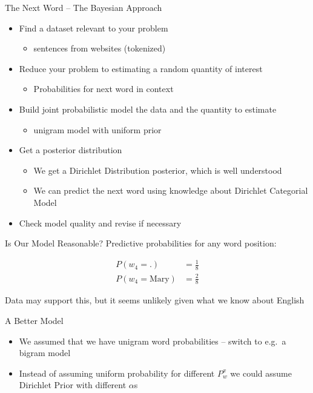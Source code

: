 \documentclass[11pt]{beamer}
\begin{document}
	\begin{frame}{The Next Word -- The Bayesian Approach}
		\centering
		\begin{itemize}
			\item Find a dataset relevant to your problem
			\begin{itemize}
				\item sentences from websites (tokenized) \checkmark
			\end{itemize}
			\item Reduce your problem to estimating a random quantity of interest
			\begin{itemize}
				\item Probabilities for next word in context \checkmark 
			\end{itemize}
			\item Build joint probabilistic model the data and the quantity to estimate
			\begin{itemize}
				\item unigram model with uniform prior \checkmark
			\end{itemize}
			\item<2-> Get a posterior distribution
			\begin{itemize}
				\item<2-> We get a Dirichlet Distribution posterior, which is well understood \checkmark
				\item<2-> We can predict the next word using knowledge about Dirichlet Categorial Model \checkmark
			\end{itemize}
			\item<3-> Check model quality and revise if necessary
		\end{itemize}
	\end{frame}
	
	\begin{frame}{Is Our Model Reasonable?}
		Predictive probabilities for any word position:
		
		\begin{align}
			P(w_4 = \text{.}) & = \frac{1}{8} \\
			P(w_4 = \text{Mary}) & = \frac{2}{8}
		\end{align}
		
		\vspace{10pt}Data may support this, but it seems unlikely given what we know about English
	\end{frame}
	
	\begin{frame}{A Better Model}
		\begin{itemize}
			\item We assumed that we have unigram word probabilities -- switch to e.g.\ a bigram model
			\item Instead of assuming uniform probability for different $P_{w}^{x}$ we could assume Dirichlet Prior with different $\alpha$s
		\end{itemize}
	\end{frame}
	
\end{document}
